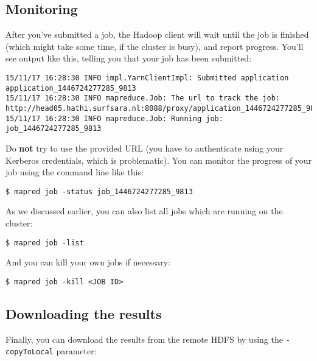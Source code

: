 \documentclass[a4paper,11pt]{article}
\begin{document}
\subsection{Monitoring}

After you've submitted a job, the Hadoop client will wait until the job is finished (which might take some
time, if the cluster is busy), and report progress.
You'll see output like this, telling you that your job has been submitted:

\begin{lstlisting}
15/11/17 16:28:30 INFO impl.YarnClientImpl: Submitted application application_1446724277285_9813
15/11/17 16:28:30 INFO mapreduce.Job: The url to track the job: http://head05.hathi.surfsara.nl:8088/proxy/application_1446724277285_9813/
15/11/17 16:28:30 INFO mapreduce.Job: Running job: job_1446724277285_9813
\end{lstlisting}

Do \textbf{not} try to use the provided URL (you have to authenticate using your Kerberos credentials,
which is problematic). You can monitor the progress of your job using the command line like this:

\begin{lstlisting}
$ mapred job -status job_1446724277285_9813
\end{lstlisting}

\pagebreak
As we discussed earlier, you can also list all jobs which are running on the cluster:

\begin{lstlisting}
$ mapred job -list
\end{lstlisting}

And you can kill your own jobs if necessary:

\begin{lstlisting}
$ mapred job -kill <JOB ID>
\end{lstlisting}


  \subsection{Downloading the results}

  Finally, you can download the results from the remote HDFS by using the \texttt{-copyToLocal} parameter:
\end{document}
